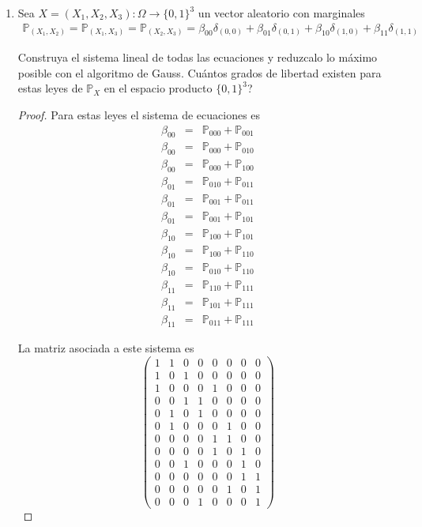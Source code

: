 \documentclass[paper=letter, fontsize=11pt]{scrartcl} %
\numberwithin{equation}{section} %
\numberwithin{figure}{section} %
\numberwithin{table}{section} %
\newcommand{\pr}[1]{\mathbb{P}_{#1}}
\begin{document}
\begin{enumerate}[label = \arabic*)]
\begin{proof}
Por lo que vemos que los grados de libertad de estas leyes son 4.
\end{proof}

\item Sea $ X = (X_1,X_2,X_3):\Omega \to \{0,1\}^3 $ un vector aleatorio con marginales
\begin{eqnarray}
\mathbb{P}_{(X_1,X_2)}=\mathbb{P}_{(X_1,X_3)}=\mathbb{P}_{(X_2,X_3)}=\beta_{00}\delta_{(0,0)}+\beta_{01}\delta_{(0,1)}+\beta_{10}\delta_{(1,0)}+\beta_{11}\delta_{(1,1)} \nonumber
\end{eqnarray}

Construya el sistema lineal de todas las ecuaciones y reduzcalo lo máximo posible con el algoritmo de Gauss. Cuántos grados de libertad existen para estas leyes de $ \mathbb{P}_X $ en el espacio producto $ \{0,1\}^3 $? 
\begin{proof}
Para estas leyes el sistema de ecuaciones es
\begin{eqnarray}
\beta_{00}&=&\pr{000}+\pr{001} \nonumber
\\\beta_{00}&=&\pr{000}+\pr{010}\nonumber
\\\beta_{00}&=&\pr{000}+\pr{100}\nonumber
\\\beta_{01}&=&\pr{010}+\pr{011}\nonumber
\\\beta_{01}&=&\pr{001}+\pr{011}\nonumber
\\\beta_{01}&=&\pr{001}+\pr{101}\nonumber
\\\beta_{10}&=&\pr{100}+\pr{101}\nonumber
\\\beta_{10}&=&\pr{100}+\pr{110}\nonumber
\\\beta_{10}&=&\pr{010}+\pr{110}\nonumber
\\\beta_{11}&=&\pr{110}+\pr{111}\nonumber
\\\beta_{11}&=&\pr{101}+\pr{111}\nonumber
\\\beta_{11}&=&\pr{011}+\pr{111}\nonumber
\end{eqnarray}

La matriz asociada a este sistema es
\begin{equation}
\begin{pmatrix}
 1 & 1 & 0 & 0 & 0 & 0 & 0 & 0 \\
 1 & 0 & 1 & 0 & 0 & 0 & 0 & 0 \\
 1 & 0 & 0 & 0 & 1 & 0 & 0 & 0 \\
 0 & 0 & 1 & 1 & 0 & 0 & 0 & 0 \\
 0 & 1 & 0 & 1 & 0 & 0 & 0 & 0 \\
 0 & 1 & 0 & 0 & 0 & 1 & 0 & 0 \\
 0 & 0 & 0 & 0 & 1 & 1 & 0 & 0 \\
 0 & 0 & 0 & 0 & 1 & 0 & 1 & 0 \\
 0 & 0 & 1 & 0 & 0 & 0 & 1 & 0 \\
 0 & 0 & 0 & 0 & 0 & 0 & 1 & 1 \\
 0 & 0 & 0 & 0 & 0 & 1 & 0 & 1 \\
 0 & 0 & 0 & 1 & 0 & 0 & 0 & 1
\end{pmatrix} \nonumber
\end{equation}


\end{proof}
\end{enumerate}
\end{document}
